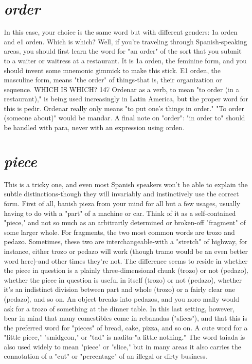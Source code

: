 \section{\emph{order}}

In this case, your choice is the same word but with different
genders: 1a orden and e1 orden. Which is which? Well, if you're traveling through Spanish-speaking areas, you should first learn the word for
"an order" of the sort that you submit to a waiter or waitress at a restaurant. It is 1a orden, the feminine form, and you should invent some
mnemonic gimmick to make this stick. E1 orden, the masculine form,
means "the order" of things-that is, their organization or sequence.
WHICH IS WHICH? 147
Ordenar as a verb, to mean "to order (in a restaurant)," is being used
increasingly in Latin America, but the proper word for this is pedir.
Ordenar really only means "to put one's things in order." "To order
(someone about)" would be mandar. A final note on "order": "in order
to" should be handled with para, never with an expression using
orden.

\section{\emph{piece}}

This is a tricky one, and even most Spanish speakers won't be
able to explain the subtle distinctions-though they will invariably
and instinctively use the correct form. First of all, banish pieza from
your mind for all but a few usages, usually having to do with a "part"
of a machine or car. Think of it as a self-contained "piece," and not so
much as an arbitrarily determined or broken-off "fragment" of some
larger whole.
For fragments, the two most common words are trozo and
pedazo. Sometimes, these two are interchangeable-with a "stretch"
of highway, for instance, either trozo or pedazo will work (though
tramo would be an even better word here)-and other times they're
not. The difference seems to reside in whether the piece in question is
a plainly three-dimensional chunk (trozo) or not (pedazo), whether the
piece in question is useful in itself (trozo) or not (pedazo), whether it's
an indistinct division between part and whole (trozo) or a fairly clear
one (pedazo), and so on. An object breaks into pedazos, and you noro mally would ask for a trozo of something at the dinner table.
In this last setting, however, bear in mind that many comestibles come in rebanadas ("slices"), and that this is the preferred word
for "pieces" of bread, cake, pizza, and so on. A cute word for a "little
piece," "smidgeon," or "tad" is nadita-"a little nothing." The word
taiada is also used widely to mean "piece" or "slice," but in many
areas it also carries the connotation of a "cut" or "percentage" of an
illegal or dirty business.

